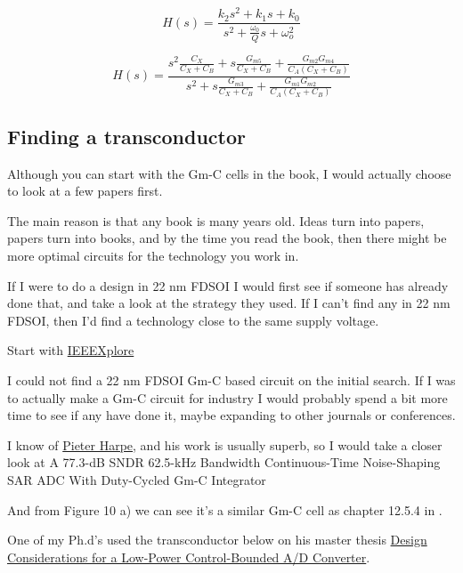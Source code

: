 \[ H(s) = \frac{k_2 s^2 + k_1 s + k_0}{s^2 + \frac{\omega_0}{Q} s +
 \omega_o^2}\]

\[ H(s) = \frac{ s^2\frac{C_X}{C_X + C_B} + s\frac{G_{m5}}{C_X + C_B} + \frac{G_{m2}G_{m4}}{C_A(C_X + C_B)}}
{s^2 + s\frac{G_{m3}}{C_X + C_B} + \frac{G_{m1}G_{m2}}{C_A(C_X + C_B)} }\]

\subsection{Finding a transconductor}\label{finding-a-transconductor}

Although you can start with the Gm-C cells in the book, I would actually
choose to look at a few papers first.

The main reason is that any book is many years old. Ideas turn into
papers, papers turn into books, and by the time you read the book, then
there might be more optimal circuits for the technology you work in.

If I were to do a design in 22 nm FDSOI I would first see if someone has
already done that, and take a look at the strategy they used. If I can't
find any in 22 nm FDSOI, then I'd find a technology close to the same
supply voltage.

Start with
\href{https://ieeexplore.ieee.org/search/searchresult.jsp?queryText=Gm-C&highlight=true&returnType=SEARCH&matchPubs=true&sortType=newest&returnFacets=ALL&refinements=PublicationTitle:IEEE\%20Journal\%20of\%20Solid-State\%20Circuits}{IEEEXplore}

I could not find a 22 nm FDSOI Gm-C based circuit on the initial search.
If I was to actually make a Gm-C circuit for industry I would probably
spend a bit more time to see if any have done it, maybe expanding to
other journals or conferences.

I know of
\href{https://scholar.google.nl/citations?user=nLhKSsMAAAAJ&hl=nl}{Pieter
Harpe}, and his work is usually superb, so I would take a closer look at
A 77.3-dB SNDR 62.5-kHz Bandwidth Continuous-Time Noise-Shaping SAR ADC
With Duty-Cycled Gm-C Integrator 

And from Figure 10 a) we can see it's a similar Gm-C cell as chapter
12.5.4 in .

One of my Ph.d's used the transconductor below on his master thesis
\href{https://ntnuopen.ntnu.no/ntnu-xmlui/handle/11250/2824253}{Design
Considerations for a Low-Power Control-Bounded A/D Converter}.


